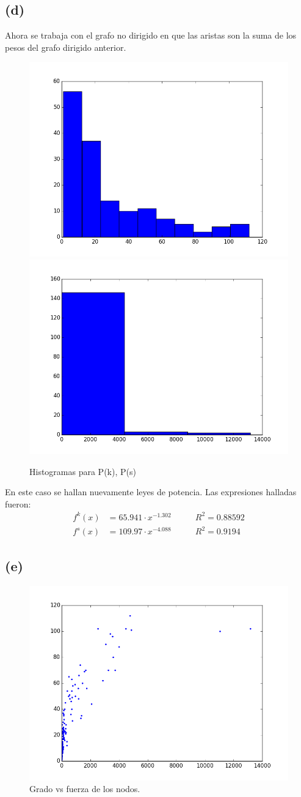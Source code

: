 \documentclass[letterpaper]{article}
\begin{document}
\subsection*{(d)}
Ahora se trabaja con el grafo no dirigido en que las aristas son la suma de los pesos del grafo dirigido anterior.
\begin{figure}[H]
  \centering
  \includegraphics[width=.49\linewidth]{img/p9-k.png}\hfill
  \includegraphics[width=.49\linewidth]{img/p9-s.png}\hfill
  \caption{Histogramas para P(k), P(s)}
  \label{chart:3}
\end{figure}
En este caso se hallan nuevamente leyes de potencia. Las expresiones halladas fueron:
\begin{align}
  f^{k}(x)  &= 65.941\cdot x^{-1.302} & \qquad R^2 = 0.88592 \\
  f^{s}(x)  &= 109.97\cdot x^{-4.088}  & \qquad R^2 = 0.9194
\end{align}



\subsection*{(e)}

\begin{figure}[H]
  \centering
  \includegraphics[width=.75\linewidth]{img/p9-k-vs-s.png}
  \caption{Grado vs fuerza de los nodos.}
  \label{chart:4}
\end{figure}
\end{document}
